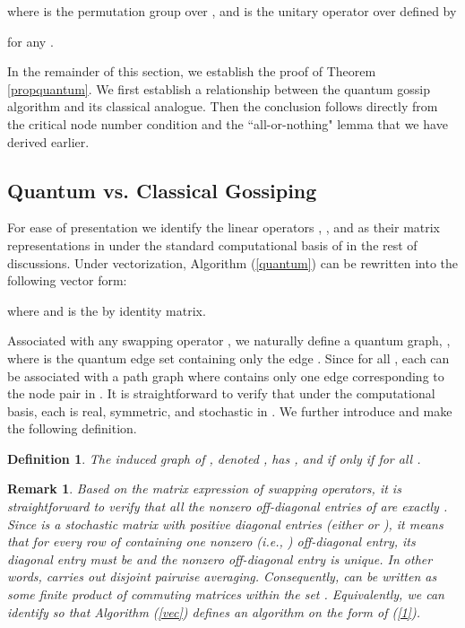 \documentclass[a4paper, 11pt]{article}
\newtheorem{definition}{Definition}
\newtheorem{remark}{Remark}
\begin{document}
where  is the permutation group over , and    is the  unitary operator over  defined  by

for any .



 In the remainder of this section, we establish the proof of Theorem \ref{propquantum}. We first establish a relationship between the quantum gossip algorithm and its classical analogue. Then the conclusion follows directly from the critical node number condition and the ``all-or-nothing" lemma that we have derived earlier.
\subsection{Quantum  vs. Classical Gossiping}


For {ease} of presentation we identify the linear operators , , and  as their matrix representations in  under the standard computational basis of  in the rest of discussions. Under vectorization,   Algorithm (\ref{quantum}) can be rewritten  into the following vector form:

where  and  is the  by  identity matrix.

Associated with  any swapping operator , we naturally define a quantum  graph, , where  is the quantum edge set containing {only the} edge . Since  for all , {each  can be associated with a  path graph}   where  contains only one edge corresponding to the node pair in . {It is straightforward to verify that under the computational basis, each  is real, symmetric, and stochastic in . We further introduce  and make the following definition.}

\medskip

\begin{definition}
The induced graph of , denoted , {has} , and  if only if  for all .
\end{definition}

\medskip



\begin{remark}\label{remark-Tk}
Based on the matrix expression of swapping operators, it is straightforward to verify that all the nonzero  off-diagonal entries of  are exactly . Since  is a stochastic matrix with positive diagonal entries (either  or ), it means that for every row of  containing one nonzero (i.e., ) off-diagonal entry, its diagonal entry must be  and the nonzero off-diagonal entry is unique. In other words,  carries out disjoint pairwise averaging. Consequently,  can be written as some finite product of  commuting  matrices within the set . Equivalently, we can identify  so that Algorithm (\ref{vec}) defines an algorithm on the form of (\ref{1}).
\end{remark}
\end{document}
